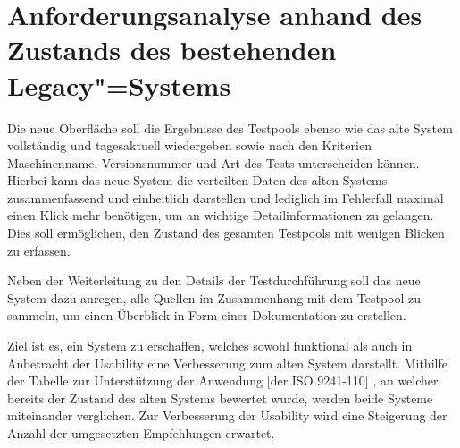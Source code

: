 \section{Anforderungsanalyse anhand des Zustands des bestehenden Legacy"=Systems}
\label{ch:Dashboard:sec:Anforderungen}

Die neue Oberfläche soll die Ergebnisse des Testpools ebenso wie das alte System vollständig und tagesaktuell wiedergeben sowie nach den Kriterien Maschinenname, Versionsnummer und Art des Tests unterscheiden können. 
Hierbei kann das neue System die verteilten Daten des alten Systems zusammenfassend und einheitlich darstellen und lediglich im Fehlerfall maximal einen Klick mehr benötigen, um an wichtige Detailinformationen zu gelangen. Dies soll ermöglichen, den Zustand des gesamten Testpools mit wenigen Blicken zu erfassen.

Neben der Weiterleitung zu den Details der Testdurchführung soll das neue System dazu anregen, alle Quellen im Zusammenhang mit dem Testpool zu sammeln, um einen Überblick in Form einer Dokumentation zu erstellen.

Ziel ist es, ein System zu erschaffen, welches sowohl funktional als auch in Anbetracht der Usability eine Verbesserung zum alten System darstellt. Mithilfe der \glqq Tabelle zur Unterstützung der Anwendung [der ISO 9241-110]\grqq{} \cite{DIN_EN_ISO_9241-110}, an welcher bereits der Zustand des alten Systems bewertet wurde, werden beide Systeme miteinander verglichen. Zur Verbesserung der Usability wird eine Steigerung der Anzahl der umgesetzten Empfehlungen erwartet.   %





